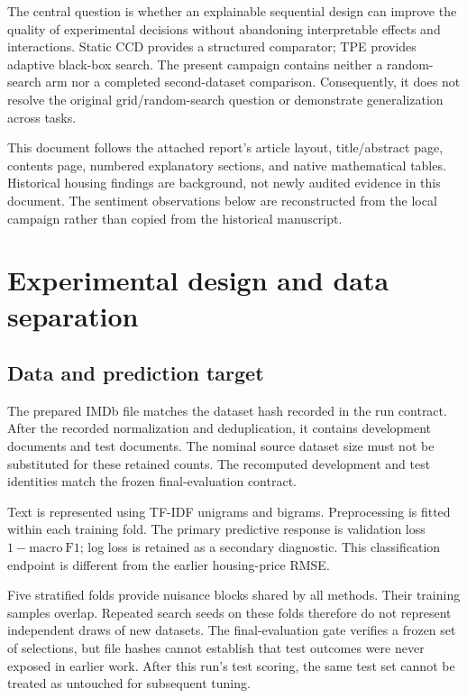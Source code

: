\documentclass[12pt,a4paper]{article}
\begin{document}
The central question is whether an explainable sequential design can improve the quality of experimental decisions without abandoning interpretable effects and interactions. Static CCD provides a structured comparator; TPE provides adaptive black-box search. The present campaign contains neither a random-search arm nor a completed second-dataset comparison. Consequently, it does not resolve the original grid/random-search question or demonstrate generalization across tasks.

This document follows the attached report's article layout, title/abstract page, contents page, numbered explanatory sections, and native mathematical tables. Historical housing findings are background, not newly audited evidence in this document. The sentiment observations below are reconstructed from the local campaign rather than copied from the historical manuscript.

\section{Experimental design and data separation}
\subsection{Data and prediction target}
The prepared IMDb file matches the dataset hash recorded in the run contract. After the recorded normalization and deduplication, it contains \DevCount{} development documents and \TestCount{} test documents. The nominal source dataset size must not be substituted for these retained counts. The recomputed development and test identities match the frozen final-evaluation contract.

Text is represented using TF-IDF unigrams and bigrams. Preprocessing is fitted within each training fold. The primary predictive response is validation loss $1-\mathrm{macro\ F1}$; log loss is retained as a secondary diagnostic. This classification endpoint is different from the earlier housing-price RMSE.

Five stratified folds provide nuisance blocks shared by all methods. Their training samples overlap. Repeated search seeds on these folds therefore do not represent independent draws of new datasets. The final-evaluation gate verifies a frozen set of selections, but file hashes cannot establish that test outcomes were never exposed in earlier work. After this run's test scoring, the same test set cannot be treated as untouched for subsequent tuning.
\end{document}
